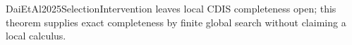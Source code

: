 DaiEtAl2025SelectionIntervention leaves local CDIS completeness open; this theorem supplies exact completeness by finite global search without claiming a local calculus.